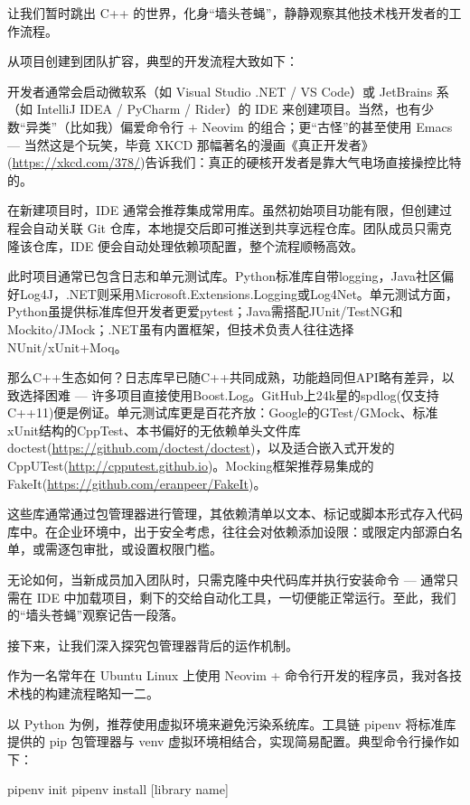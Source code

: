 
让我们暂时跳出 C++ 的世界，化身“墙头苍蝇”，静静观察其他技术栈开发者的工作流程。

从项目创建到团队扩容，典型的开发流程大致如下：

开发者通常会启动微软系（如 Visual Studio .NET / VS Code）或 JetBrains 系（如 IntelliJ IDEA / PyCharm / Rider）的 IDE 来创建项目。当然，也有少数“异类”（比如我）偏爱命令行 + Neovim 的组合；更“古怪”的甚至使用 Emacs --- 当然这是个玩笑，毕竟 XKCD 那幅著名的漫画《真正开发者》(\url{https://xkcd.com/378/})告诉我们：真正的硬核开发者是靠大气电场直接操控比特的。

在新建项目时，IDE 通常会推荐集成常用库。虽然初始项目功能有限，但创建过程会自动关联 Git 仓库，本地提交后即可推送到共享远程仓库。团队成员只需克隆该仓库，IDE 便会自动处理依赖项配置，整个流程顺畅高效。

此时项目通常已包含日志和单元测试库。Python标准库自带logging，Java社区偏好Log4J，.NET则采用Microsoft.Extensions.Logging或Log4Net。单元测试方面，Python虽提供标准库但开发者更爱pytest；Java需搭配JUnit/TestNG和Mockito/JMock；.NET虽有内置框架，但技术负责人往往选择NUnit/xUnit+Moq。

那么C++生态如何？日志库早已随C++共同成熟，功能趋同但API略有差异，以致选择困难 --- 许多项目直接使用Boost.Log。GitHub上24k星的spdlog(仅支持C++11)便是例证。单元测试库更是百花齐放：Google的GTest/GMock、标准xUnit结构的CppTest、本书偏好的无依赖单头文件库doctest(\url{https://github.com/doctest/doctest})，以及适合嵌入式开发的CppUTest(\url{http://cpputest.github.io})。Mocking框架推荐易集成的FakeIt(\url{https://github.com/eranpeer/FakeIt})。

这些库通常通过包管理器进行管理，其依赖清单以文本、标记或脚本形式存入代码库中。在企业环境中，出于安全考虑，往往会对依赖添加设限：或限定内部源白名单，或需逐包审批，或设置权限门槛。

无论如何，当新成员加入团队时，只需克隆中央代码库并执行安装命令 --- 通常只需在 IDE 中加载项目，剩下的交给自动化工具，一切便能正常运行。至此，我们的“墙头苍蝇”观察记告一段落。

接下来，让我们深入探究包管理器背后的运作机制。

作为一名常年在 Ubuntu Linux 上使用 Neovim + 命令行开发的程序员，我对各技术栈的构建流程略知一二。

以 Python 为例，推荐使用虚拟环境来避免污染系统库。工具链 pipenv 将标准库提供的 pip 包管理器与 venv 虚拟环境相结合，实现简易配置。典型命令行操作如下：

\begin{shell}
pipenv init
pipenv install [library name]
\end{shell}

